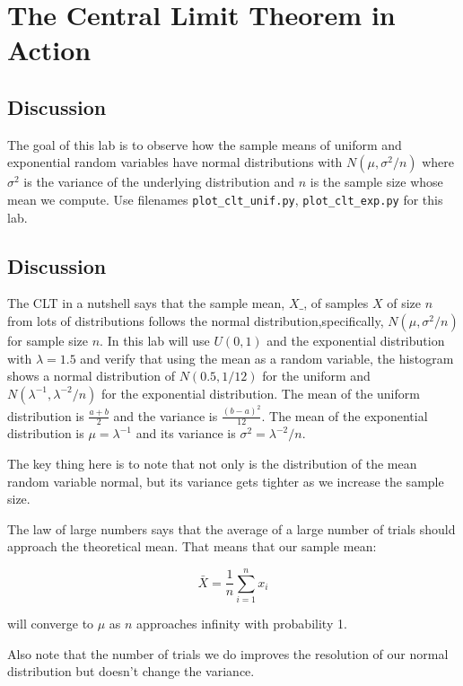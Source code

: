 \chapter{The Central Limit Theorem in Action}

\setcounter{problem}{1}

\section{Discussion}

\begin{fullwidth}

The goal of this lab is to observe how the sample means of uniform and exponential random variables have normal distributions with $N(\mu, \sigma^2/n)$ where $\sigma^2$ is the variance of the underlying distribution and $n$ is the sample size whose mean we compute. Use filenames {\tt plot\_clt\_unif.py}, {\tt plot\_clt\_exp.py} for this lab.

\section{Discussion}

The CLT in a nutshell says that the sample mean, $X\_$, of samples $X$ of size $n$
from lots of distributions follows the normal distribution,specifically, $N(\mu, \sigma^2/n)$ for sample size $n$.
 In this lab will use $U(0,1)$ and the exponential distribution with $\lambda=1.5$
and verify that using the mean as a random variable, the histogram shows a normal distribution of $N(0.5,1/12)$ for the uniform and $N(\lambda^{-1}, \lambda^{-2}/n)$ for the exponential distribution. The mean of the uniform distribution is $\frac{a+b}{2}$ and the variance is $\frac{(b-a)^2}{12}$. The mean of the exponential distribution is $\mu = \lambda^{-1}$ and its variance is $\sigma^2 = \lambda^{-2}/n$.

The key thing here is to note that not only is the distribution of the mean random variable normal, but its variance gets tighter as we increase the sample size. 

The law of large numbers says that the average of a large number of trials should approach the theoretical mean. That means that our sample mean:

\[
\bar X = \frac{1}{n} \sum_{i=1}^{n} x_i
\]

\noindent will converge to $\mu$ as $n$ approaches infinity with probability 1.

Also note that the number of trials we do improves the resolution of our normal distribution but doesn't change the variance.


\end{fullwidth}
